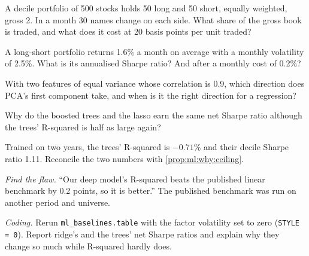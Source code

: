 \begin{exercise}[$\star$]\label{exo:ml:linear-and-regularised-baselines:1}
A decile portfolio of 500 stocks holds 50 long and 50 short, equally weighted, gross 2. In a month 30 names change on
each side. What share of the gross book is traded, and what does it cost at 20 basis points per unit traded?
\end{exercise}

\begin{exercise}[$\star$]\label{exo:ml:linear-and-regularised-baselines:2}
A long-short portfolio returns 1.6\% a month on average with a monthly volatility of 2.5\%. What is its annualised
Sharpe ratio? And after a monthly cost of 0.2\%?
\end{exercise}

\begin{exercise}[$\star$]\label{exo:ml:linear-and-regularised-baselines:3}
With two features of equal variance whose correlation is 0.9, which direction does PCA's first component take, and
when is it the right direction for a regression?
\end{exercise}

\begin{exercise}[$\star\star$]\label{exo:ml:linear-and-regularised-baselines:4}
Why do the boosted trees and the lasso earn the same net Sharpe ratio although the trees' R-squared is half as large
again?
\end{exercise}

\begin{exercise}[$\star\star$]\label{exo:ml:linear-and-regularised-baselines:5}
Trained on two years, the trees' R-squared is $-0.71\%$ and their decile Sharpe ratio 1.11. Reconcile the two numbers
with \cref{prop:ml:why:ceiling}.
\end{exercise}

\begin{exercise}[$\star\star$]\label{exo:ml:linear-and-regularised-baselines:6}
\emph{Find the flaw.} ``Our deep model's R-squared beats the published linear benchmark by 0.2 points, so it is better.''
The published benchmark was run on another period and universe.
\end{exercise}

\begin{exercise}[$\star\star\star$]\label{exo:ml:linear-and-regularised-baselines:7}
\emph{Coding.} Rerun \texttt{ml\_baselines.table} with the factor volatility set to zero (\texttt{STYLE = 0}). Report
ridge's and the trees' net Sharpe ratios and explain why they change so much while R-squared hardly does.
\end{exercise}

